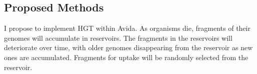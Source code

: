 \subsection{Proposed Methods}

I propose to implement HGT within Avida.  As organisms die, fragments of their genomes will accumulate in reservoirs.  The fragments in the reservoirs will deteriorate over time, with older genomes disappearing from the reservoir as new ones are accumulated. Fragments for uptake will be randomly selected from the reservoir.  

